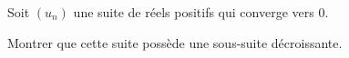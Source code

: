 \begin{enonce}
\begin{exercise}[ID={RMS135 E1447},subtitle={Navale 2024},tags={},difficulty={}]

Soit $(u_n)$ une suite de réels positifs qui converge vers $0$.

Montrer que cette suite possède une sous-suite décroissante.

\end{exercise}
\begin{solution}
\end{solution}
\end{enonce}
